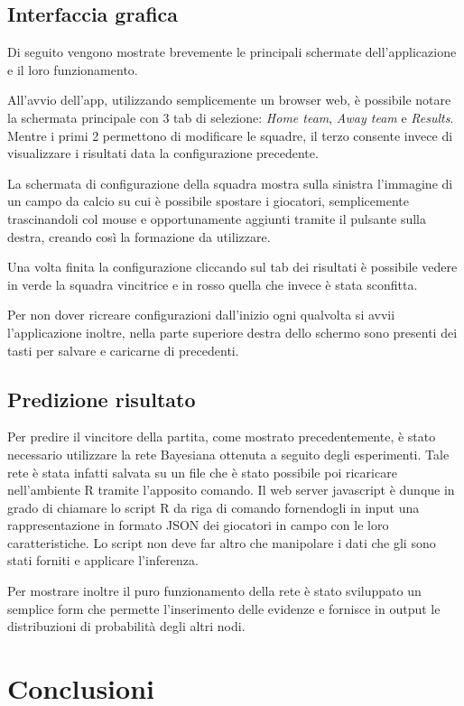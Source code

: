 \documentclass[hidelinks, 12pt]{article}
\begin{document}
\subsection{Interfaccia grafica}

Di seguito vengono mostrate brevemente le principali schermate dell'applicazione e il loro funzionamento.

All'avvio dell'app, utilizzando semplicemente un browser web, è possibile notare la schermata principale con 3 tab di selezione: {\it Home team}, {\it Away team} e {\it Results}. Mentre i primi 2 permettono di modificare le squadre, il terzo consente invece di visualizzare i risultati data la configurazione precedente.


La schermata di configurazione della squadra mostra sulla sinistra l'immagine di un campo da calcio su cui è possibile spostare i giocatori, semplicemente trascinandoli col mouse e opportunamente aggiunti tramite il pulsante sulla destra, creando così la formazione da utilizzare.


Una volta finita la configurazione cliccando sul tab dei risultati è possibile vedere in verde la squadra vincitrice e in rosso quella che invece è stata sconfitta.


Per non dover ricreare configurazioni dall'inizio ogni qualvolta si avvii l'applicazione inoltre, nella parte superiore destra dello schermo sono presenti dei tasti per salvare e caricarne di precedenti.


\subsection{Predizione risultato}

Per predire il vincitore della partita, come mostrato precedentemente, è stato necessario utilizzare la rete Bayesiana ottenuta a seguito degli esperimenti. Tale rete è stata infatti salvata su un file che è stato possibile poi ricaricare nell'ambiente R tramite l'apposito comando. Il web server javascript è dunque in grado di chiamare lo script R da riga di comando fornendogli in input una rappresentazione in formato JSON dei giocatori in campo con le loro caratteristiche. Lo script non deve far altro che manipolare i dati che gli sono stati forniti e applicare l'inferenza.

Per mostrare inoltre il puro funzionamento della rete è stato sviluppato un semplice form che permette l'inserimento delle evidenze e fornisce in output le distribuzioni di probabilità degli altri nodi.


\clearpage
\section{Conclusioni}

\newpage


\end{document}
